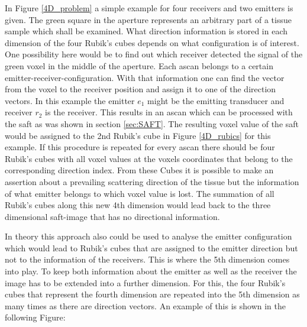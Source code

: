 In Figure \ref{4D_problem} a simple example for four receivers and two emitters is given. The green square in the aperture represents an arbitrary part of a tissue sample which shall be examined. What direction information is stored in each dimension of the four Rubik's cubes depends on what configuration is of interest. One possibility here would be to find out which receiver detected the signal of the green voxel in the middle of the aperture. Each \ac{ascan} belongs to a certain emitter-receiver-configuration. With that information one can find the vector from the voxel to the receiver position and assign it to one of the direction vectors. In this example the emitter $e_1$ might be the emitting transducer and receiver $r_2$ is the receiver. This results in an \ac{ascan} which can be processed with the \ac{saft} as was shown in section \ref{sec:SAFT}. The resulting voxel value of the \ac{saft} would be assigned to the 2nd Rubik's cube in Figure \ref{4D_rubics} for this example. If this procedure is repeated for every \ac{ascan} there should be four Rubik's cubes with all voxel values at the voxels coordinates that belong to the corresponding direction index. From these Cubes it is possible to make an assertion about a prevailing scattering direction of the tissue but the information of what emitter belongs to which voxel value is lost. The summation of all Rubik's cubes along this new 4th dimension would lead back to the three dimensional \ac{saft}-image that has no directional information. 

In theory this approach also could be used to analyse the emitter configuration which would lead to Rubik's cubes that are assigned to the emitter direction but not to the information of the receivers. This is where the 5th dimension comes into play. To keep both information about the emitter as well as the receiver the image has to be extended into a further dimension. For this, the four Rubik's cubes that represent the fourth dimension are repeated into the 5th dimension as many times as there are direction vectors. An example of this is shown in the following Figure:


